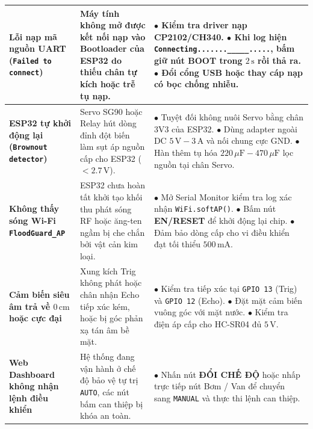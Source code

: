 \begin{xltabular}{\textwidth}{|>{\raggedright\arraybackslash\bfseries}p{3.2cm}|>{\raggedright\arraybackslash}X|>{\raggedright\arraybackslash}X|}
Lỗi nạp mã nguồn UART (\texttt{Failed to connect}) 
& Máy tính không mở được kết nối nạp vào Bootloader của ESP32 do thiếu chân tự kích hoặc trễ tụ nạp. 
& $\bullet$ Kiểm tra driver nạp CP2102/CH340.\newline
$\bullet$ Khi log hiện \lstinline|Connecting......._____.....|, bấm giữ nút \textbf{BOOT} trong $2\,\text{s}$ rồi thả ra.\newline
$\bullet$ Đổi cổng USB hoặc thay cáp nạp có bọc chống nhiễu. \\ \hline
ESP32 tự khởi động lại (\texttt{Brownout detector}) 
& Servo SG90 hoặc Relay hút dòng đỉnh đột biến làm sụt áp nguồn cấp cho ESP32 ($< 2.7\,\text{V}$). 
& $\bullet$ Tuyệt đối không nuôi Servo bằng chân 3V3 của ESP32.\newline
$\bullet$ Dùng adapter ngoài DC $5\,\text{V} - 3\,\text{A}$ và nối chung cực GND.\newline
$\bullet$ Hàn thêm tụ hóa $220\,\mu\text{F} - 470\,\mu\text{F}$ lọc nguồn tại chân Servo. \\ \hline
Không thấy sóng Wi-Fi \texttt{FloodGuard\_AP} 
& ESP32 chưa hoàn tất khởi tạo khối thu phát sóng RF hoặc ăng-ten ngầm bị che chắn bởi vật cản kim loại. 
& $\bullet$ Mở Serial Monitor kiểm tra log xác nhận \texttt{WiFi.softAP()}.\newline
$\bullet$ Bấm nút \textbf{EN/RESET} để khởi động lại chip.\newline
$\bullet$ Đảm bảo dòng cấp cho vi điều khiển đạt tối thiểu $500\,\text{mA}$. \\ \hline
Cảm biến siêu âm trả về $0\,\text{cm}$ hoặc cực đại 
& Xung kích Trig không phát hoặc chân nhận Echo tiếp xúc kém, hoặc bị góc phản xạ tán âm bề mặt. 
& $\bullet$ Kiểm tra tiếp xúc tại \texttt{GPIO 13} (Trig) và \texttt{GPIO 12} (Echo).\newline
$\bullet$ Đặt mặt cảm biến vuông góc với mặt nước.\newline
$\bullet$ Kiểm tra điện áp cấp cho HC-SR04 đủ $5\,\text{V}$. \\ \hline
Web Dashboard không nhận lệnh điều khiển 
& Hệ thống đang vận hành ở chế độ bảo vệ tự trị \texttt{AUTO}, các nút bấm can thiệp bị khóa an toàn. 
& $\bullet$ Nhấn nút \textbf{ĐỔI CHẾ ĐỘ} hoặc nhấp trực tiếp nút Bơm / Van để chuyển sang \texttt{MANUAL} và thực thi lệnh can thiệp. \\ \hline
\end{xltabular}
\endgroup
